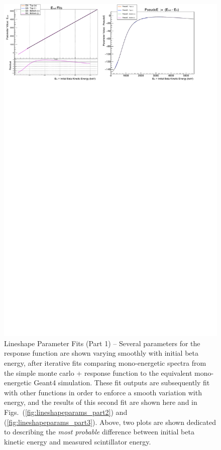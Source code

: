 \begin{figure}[h!!tb]
	\centering
	\includegraphics[width=.999\linewidth]
	{Figures/LineshapeParams_Set1.pdf}
	\caption[Lineshape Parameter Fits (Part 1)]{Lineshape Parameter Fits (Part 1) -- Several parameters for the response function are shown varying smoothly with initial beta energy, after iterative fits comparing mono-energetic spectra from the simple monte carlo + response function to the equivalent mono-energetic Geant4 simulation.  These fit outputs are subsequently fit with other functions in order to enforce a smooth variation with energy, and the results of this second fit are shown here and in Figs.~(\ref{fig:lineshapeparams_part2}) and (\ref{fig:lineshapeparams_part3}).   Above, two plots are shown dedicated to describing the \emph{most probable} difference between initial beta kinetic energy and measured scintillator energy.
}
\end{figure}
